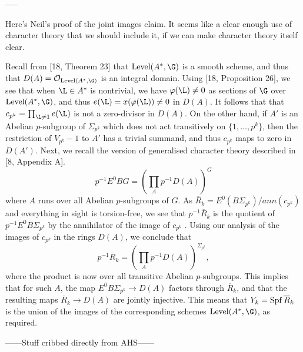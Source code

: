 -----

Here's Neil's proof of the joint images claim.  It seems like a clear enough use of character theory that we should include it, if we can make character theory itself clear.

Recall from [18, Theorem 23] that $\Level(A^*,\G)$ is a smooth scheme, and thus that $D(A) = \sheaf O_{\Level(A^*,\G)}$ is an integral domain. Using [18, Proposition 26], we see that when $\L \in A^*$ is nontrivial, we have $\phi(\L) \ne 0$ as sections of $\G$ over $\Level(A^*, \G)$, and thus $e(\L) = x(\phi(\L)) \ne 0$ in $D(A)$. It follows that that $c_{p^k} = \prod_{\L \ne 1} e(\L)$ is not a zero-divisor in $D(A)$. On the other hand, if $A'$ is an Abelian $p$-subgroup of $\Sigma_{p^k}$ which does not act transitively on $\{1, \ldots, p^k\}$, then the restriction of $V_{p^k} − 1$ to $A'$ has a trivial summand, and thus $c_{p^k}$ maps to zero in $D(A')$. Next, we recall the version of generalised character theory described in [8, Appendix A].
\[p^{-1} E^0 BG = \left(\prod_A p^{-1} D(A)\right)^G\]
where $A$ runs over all Abelian $p$-subgroups of $G$. As $\overline R_k = E^0(B\Sigma_{p^k} )/ ann(c_{p^k} )$ and everything in sight is torsion-free, we see that $p^{−1} \overline R_k$ is the quotient of $p^{−1}E^0B\Sigma_{p^k}$ by the annihilator of the image of $c_{p^k}$ . Using our analysis of the images of $c_{p^k}$ in the rings $D(A)$, we conclude that
\[p^{-1} \overline R_k = \left(\prod_A p^{−1}D(A)\right)^{\Sigma_{p^k}},\]
where the product is now over all transitive Abelian $p$-subgroups. This implies that for such $A$, the map $E^0B\Sigma_{p^k} \to D(A)$ factors through $\overline R_k$, and that the resulting maps $\overline R_k \to D(A)$ are jointly injective. This means that $Y_k = \operatorname{Spf} \overline R_k$ is the union of the images of the corresponding schemes $\Level(A^*,\G)$, as required.




------Stuff cribbed directly from AHS------



